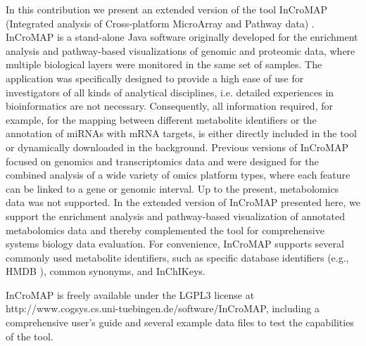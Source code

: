 \documentclass[final,5p,times,twocolumn]{elsarticle}
\begin{document}
In this contribution we present an extended version of the tool InCroMAP (Integrated analysis of Cross-platform MicroArray and Pathway data) \cite{Wrzodek2012a,Wrzodek2012b}. InCroMAP is a stand-alone Java software originally developed for the enrichment analysis and pathway-based visualizations of genomic and proteomic data, where multiple biological layers were monitored in the same set of samples. The application was specifically designed to provide a high ease of use for investigators of all kinds of analytical disciplines, i.e. detailed experiences in bioinformatics are not necessary. Consequently, all information required, for example, for the mapping between different metabolite identifiers or the annotation of miRNAs with mRNA targets, is either directly included in the tool or dynamically downloaded in the background. Previous versions of InCroMAP focused on genomics and transcriptomics data and were designed for the combined analysis of a wide variety of omics platform types, where 
each feature can be linked to a gene or genomic interval. Up to the present, metabolomics data was not supported. In the extended version of InCroMAP presented here, we support the enrichment analysis and pathway-based visualization of annotated metabolomics data and thereby complemented the tool for comprehensive systems biology data evaluation. For convenience, InCroMAP supports several commonly used metabolite identifiers, such as specific database identifiers (e.g., HMDB \cite{Wishart2009}), common synonyms, and InChIKeys. 

InCroMAP is freely available under the LGPL3 license at http://www.cogsys.cs.uni-tuebingen.de/software/InCroMAP, including a comprehensive user’s guide and several example data files to test the capabilities of the tool.
\end{document}
